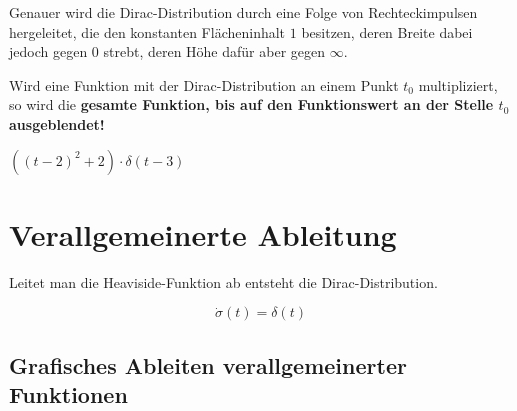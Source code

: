 \documentclass[12pt, a4paper, twoside]{scrreprt}
\begin{document}
Genauer wird die Dirac-Distribution durch eine Folge von Rechteckimpulsen hergeleitet, die den konstanten Flächeninhalt \(1\) besitzen, deren Breite dabei jedoch gegen \(0\) strebt, deren Höhe dafür aber gegen \(\infty\).

\begin{minipage}{.5\textwidth}
  Wird eine Funktion mit der Dirac-Distribution an einem Punkt \(t_0\) multipliziert, so wird die \textbf{gesamte Funktion, bis auf den Funktionswert an der Stelle \(t_0\) ausgeblendet!}
\end{minipage}\hfill%
\begin{minipage}{.5\textwidth}
  \centering
  {\footnotesize \(((t-2)^2+2) \cdot \delta(t-3)\)}
\end{minipage}

\section{Verallgemeinerte Ableitung}

Leitet man die Heaviside-Funktion ab entsteht die Dirac-Distribution.

\begin{framed}
  \[
    \dot{\sigma} (t) = \delta (t)
  \]
\end{framed}

\subsection{Grafisches Ableiten verallgemeinerter Funktionen}
\end{document}

